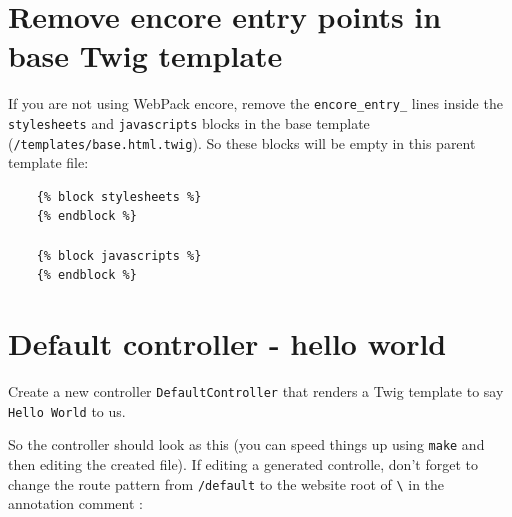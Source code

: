 \documentclass[a4paperpaper,openright]{book}
\newenvironment{Shaded}{}{}
\newcommand{\CommentTok}[1]{\textcolor[rgb]{0.38,0.63,0.69}{\textit{#1}}}
\newcommand{\KeywordTok}[1]{\textcolor[rgb]{0.00,0.44,0.13}{\textbf{#1}}}
\newcommand{\NormalTok}[1]{#1}
\newcommand{\OtherTok}[1]{\textcolor[rgb]{0.00,0.44,0.13}{#1}}
\newcommand{\StringTok}[1]{\textcolor[rgb]{0.25,0.44,0.63}{#1}}
\begin{document}
\hypertarget{remove-encore-entry-points-in-base-twig-template-3}{%
\section{Remove encore entry points in base Twig
template}\label{remove-encore-entry-points-in-base-twig-template-3}}

If you are not using WebPack encore, remove the \texttt{encore\_entry\_}
lines inside the \texttt{stylesheets} and \texttt{javascripts} blocks in
the base template (\texttt{/templates/base.html.twig}). So these blocks
will be empty in this parent template file:

\begin{verbatim}
    {% block stylesheets %}
    {% endblock %}

    {% block javascripts %}
    {% endblock %}
\end{verbatim}

\hypertarget{default-controller---hello-world}{%
\section{Default controller - hello
world}\label{default-controller---hello-world}}

Create a new controller \texttt{DefaultController} that renders a Twig
template to say \texttt{Hello\ World} to us.

So the controller should look as this (you can speed things up using
\texttt{make} and then editing the created file). If editing a generated
controlle, don't forget to change the route pattern from
\texttt{/default} to the website root of \texttt{\textbackslash{}} in
the annotation comment :

\begin{Shaded}
\end{Shaded}
\end{document}
